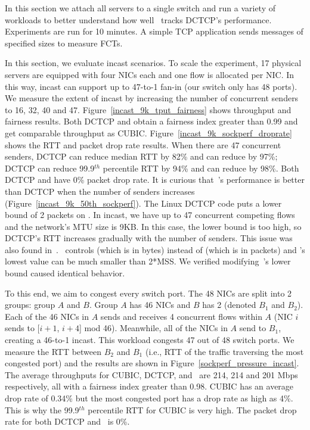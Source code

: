 In this section we attach all servers to a single switch and
run a variety of workloads to better understand
how well~\acdc{} tracks DCTCP's performance. Experiments are run for 10 minutes. A simple TCP application
sends messages of specified sizes to measure FCTs.

In this section, we evaluate incast scenarios.
To scale the experiment, 17 physical servers are equipped with four NICs each
and one flow is allocated per NIC.
In this way, incast can support up to 47-to-1 fan-in (our switch only has 48 ports).
We measure the extent of incast by increasing the number of concurrent senders to 16, 32, 40 and 47.
Figure~\ref{incast_9k_tput_fairness} shows throughput and fairness results.
Both DCTCP and \acdc{} obtain a fairness index greater than 0.99 and get comparable throughput as CUBIC.
Figure~\ref{incast_9k_sockperf_droprate} shows the RTT and packet drop rate results.
When there are 47 concurrent senders, DCTCP can reduce median RTT by 82\% and \acdc{} can reduce by 97\%;
DCTCP can reduce 99.9$^{th}$ percentile RTT by 94\% and \acdc{} can reduce by 98\%.
Both DCTCP and \acdc{} have 0\% packet drop rate. It is curious that~\acdc{}’s
performance is better than DCTCP when the number of senders increases (Figure~\ref{incast_9k_50th_sockperf}).
The Linux DCTCP code puts a lower bound of 2 packets on \cwnd{}.
In incast, we have up to 47 concurrent competing flows and
the network's MTU size is 9KB. In this case, the lower bound is too high,
so DCTCP's RTT increases gradually with the number of senders.
This issue was also found in~\cite{judd2015nsdi}.~\acdc{} controls \rwnd{} (which is in bytes)
instead of \cwnd{} (which is in packets) and \rwnd{}'s lowest value can be much smaller than 2*MSS.
We verified modifying~\acdc{}'s lower bound caused identical behavior.

To this end, we aim to congest every switch port.
The 48 NICs are split into 2 groups: group $A$ and $B$.
Group $A$ has 46 NICs and $B$ has 2 (denoted $B_1$ and $B_2$).
Each of the 46 NICs in $A$ sends and receives 4 concurrent flows within $A$
(\ie{}NIC $i$ sends to [$i+1$, $i+4$] mod 46).
Meanwhile, all of the NICs in $A$ send to $B_1$, creating a 46-to-1 incast.
This workload congests 47 out of 48 switch ports.
We measure the RTT between $B_2$ and $B_1$ (i.e., RTT of the traffic traversing the most congested port) and
the results are shown in Figure~\ref{sockperf_pressure_incast}.
The average throughputs for CUBIC, DCTCP, and~\acdc{} are 214, 214 and 201 Mbps respectively,
all with a fairness index greater than 0.98.
CUBIC has an average drop rate of 0.34\% but the most congested port has a drop rate as high as 4\%.
This is why the 99.9$^{th}$ percentile RTT for CUBIC is very high.
The packet drop rate for both DCTCP and~\acdc{} is 0\%.

